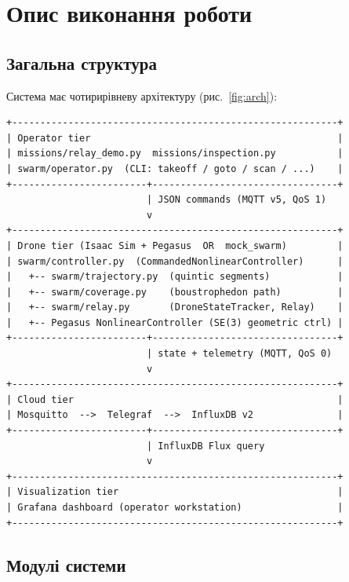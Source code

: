 \section{Опис виконання роботи}

\subsection{Загальна структура}

Система \projname{} має чотирирівневу архітектуру (рис.~\ref{fig:arch}):

\begin{verbatim}
+----------------------------------------------------------+
| Operator tier                                            |
| missions/relay_demo.py  missions/inspection.py           |
| swarm/operator.py  (CLI: takeoff / goto / scan / ...)    |
+------------------------+---------------------------------+
                         | JSON commands (MQTT v5, QoS 1)
                         v
+----------------------------------------------------------+
| Drone tier (Isaac Sim + Pegasus  OR  mock_swarm)         |
| swarm/controller.py  (CommandedNonlinearController)      |
|   +-- swarm/trajectory.py  (quintic segments)            |
|   +-- swarm/coverage.py    (boustrophedon path)          |
|   +-- swarm/relay.py       (DroneStateTracker, Relay)    |
|   +-- Pegasus NonlinearController (SE(3) geometric ctrl) |
+------------------------+---------------------------------+
                         | state + telemetry (MQTT, QoS 0)
                         v
+----------------------------------------------------------+
| Cloud tier                                               |
| Mosquitto  -->  Telegraf  -->  InfluxDB v2               |
+------------------------+---------------------------------+
                         | InfluxDB Flux query
                         v
+----------------------------------------------------------+
| Visualization tier                                       |
| Grafana dashboard (operator workstation)                 |
+----------------------------------------------------------+
\end{verbatim}

\subsection{Модулі системи}

